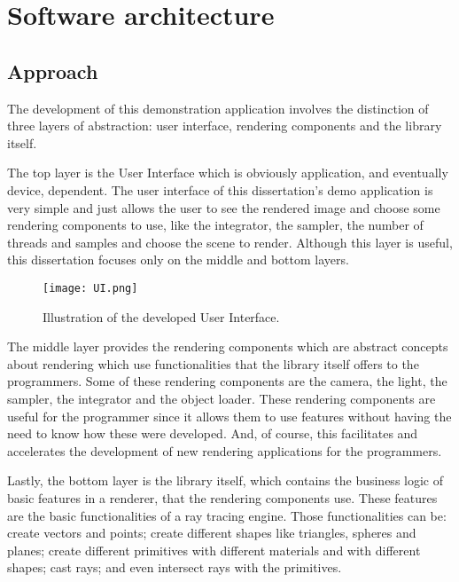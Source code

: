 \chapter{Software architecture}

\section{Approach}

\par
The development of this demonstration application involves the distinction of three layers of abstraction: user interface, rendering components and the library itself.

\par
The top layer is the User Interface which is obviously application, and eventually device, dependent.
The user interface of this dissertation's demo application is very simple and just allows the user to see the rendered image and choose some rendering components to use, like the integrator, the sampler, the number of threads and samples and choose the scene to render.
Although this layer is useful, this dissertation focuses only on the middle and bottom layers.

\begin{figure}[H]
	\centering
	\caption{Illustration of the developed User Interface.}
	\label{UI.}
	\texttt{[image: UI.png]}
\end{figure}

\par
The middle layer provides the rendering components which are abstract concepts about rendering which use functionalities that the library itself offers to the programmers.
Some of these rendering components are the camera, the light, the sampler, the integrator and the object loader.
These rendering components are useful for the programmer since it allows them to use features without having the need to know how these were developed.
And, of course, this facilitates and accelerates the development of new rendering applications for the programmers.

\par
Lastly, the bottom layer is the library itself, which contains the business logic of basic features in a renderer, that the rendering components use.
These features are the basic functionalities of a ray tracing engine.
Those functionalities can be: create vectors and points; create different shapes like triangles, spheres and planes; create different primitives with different materials and with different shapes; cast rays; and even intersect rays with the primitives.

